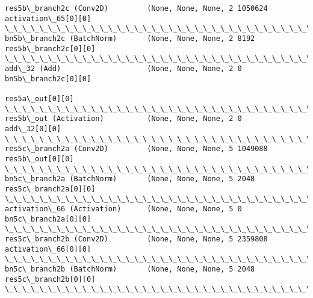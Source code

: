 \documentclass[11pt]{article}
\begin{document}
\begin{Verbatim}[commandchars=\\\{\}]
res5b\_branch2c (Conv2D)         (None, None, None, 2 1050624     activation\_65[0][0]              
\_\_\_\_\_\_\_\_\_\_\_\_\_\_\_\_\_\_\_\_\_\_\_\_\_\_\_\_\_\_\_\_\_\_\_\_\_\_\_\_\_\_\_\_\_\_\_\_\_\_\_\_\_\_\_\_\_\_\_\_\_\_\_\_\_\_\_\_\_\_\_\_\_\_\_\_\_\_\_\_\_\_\_\_\_\_\_\_\_\_\_\_\_\_\_\_\_\_
bn5b\_branch2c (BatchNorm)       (None, None, None, 2 8192        res5b\_branch2c[0][0]             
\_\_\_\_\_\_\_\_\_\_\_\_\_\_\_\_\_\_\_\_\_\_\_\_\_\_\_\_\_\_\_\_\_\_\_\_\_\_\_\_\_\_\_\_\_\_\_\_\_\_\_\_\_\_\_\_\_\_\_\_\_\_\_\_\_\_\_\_\_\_\_\_\_\_\_\_\_\_\_\_\_\_\_\_\_\_\_\_\_\_\_\_\_\_\_\_\_\_
add\_32 (Add)                    (None, None, None, 2 0           bn5b\_branch2c[0][0]              
                                                                 res5a\_out[0][0]                  
\_\_\_\_\_\_\_\_\_\_\_\_\_\_\_\_\_\_\_\_\_\_\_\_\_\_\_\_\_\_\_\_\_\_\_\_\_\_\_\_\_\_\_\_\_\_\_\_\_\_\_\_\_\_\_\_\_\_\_\_\_\_\_\_\_\_\_\_\_\_\_\_\_\_\_\_\_\_\_\_\_\_\_\_\_\_\_\_\_\_\_\_\_\_\_\_\_\_
res5b\_out (Activation)          (None, None, None, 2 0           add\_32[0][0]                     
\_\_\_\_\_\_\_\_\_\_\_\_\_\_\_\_\_\_\_\_\_\_\_\_\_\_\_\_\_\_\_\_\_\_\_\_\_\_\_\_\_\_\_\_\_\_\_\_\_\_\_\_\_\_\_\_\_\_\_\_\_\_\_\_\_\_\_\_\_\_\_\_\_\_\_\_\_\_\_\_\_\_\_\_\_\_\_\_\_\_\_\_\_\_\_\_\_\_
res5c\_branch2a (Conv2D)         (None, None, None, 5 1049088     res5b\_out[0][0]                  
\_\_\_\_\_\_\_\_\_\_\_\_\_\_\_\_\_\_\_\_\_\_\_\_\_\_\_\_\_\_\_\_\_\_\_\_\_\_\_\_\_\_\_\_\_\_\_\_\_\_\_\_\_\_\_\_\_\_\_\_\_\_\_\_\_\_\_\_\_\_\_\_\_\_\_\_\_\_\_\_\_\_\_\_\_\_\_\_\_\_\_\_\_\_\_\_\_\_
bn5c\_branch2a (BatchNorm)       (None, None, None, 5 2048        res5c\_branch2a[0][0]             
\_\_\_\_\_\_\_\_\_\_\_\_\_\_\_\_\_\_\_\_\_\_\_\_\_\_\_\_\_\_\_\_\_\_\_\_\_\_\_\_\_\_\_\_\_\_\_\_\_\_\_\_\_\_\_\_\_\_\_\_\_\_\_\_\_\_\_\_\_\_\_\_\_\_\_\_\_\_\_\_\_\_\_\_\_\_\_\_\_\_\_\_\_\_\_\_\_\_
activation\_66 (Activation)      (None, None, None, 5 0           bn5c\_branch2a[0][0]              
\_\_\_\_\_\_\_\_\_\_\_\_\_\_\_\_\_\_\_\_\_\_\_\_\_\_\_\_\_\_\_\_\_\_\_\_\_\_\_\_\_\_\_\_\_\_\_\_\_\_\_\_\_\_\_\_\_\_\_\_\_\_\_\_\_\_\_\_\_\_\_\_\_\_\_\_\_\_\_\_\_\_\_\_\_\_\_\_\_\_\_\_\_\_\_\_\_\_
res5c\_branch2b (Conv2D)         (None, None, None, 5 2359808     activation\_66[0][0]              
\_\_\_\_\_\_\_\_\_\_\_\_\_\_\_\_\_\_\_\_\_\_\_\_\_\_\_\_\_\_\_\_\_\_\_\_\_\_\_\_\_\_\_\_\_\_\_\_\_\_\_\_\_\_\_\_\_\_\_\_\_\_\_\_\_\_\_\_\_\_\_\_\_\_\_\_\_\_\_\_\_\_\_\_\_\_\_\_\_\_\_\_\_\_\_\_\_\_
bn5c\_branch2b (BatchNorm)       (None, None, None, 5 2048        res5c\_branch2b[0][0]             
\_\_\_\_\_\_\_\_\_\_\_\_\_\_\_\_\_\_\_\_\_\_\_\_\_\_\_\_\_\_\_\_\_\_\_\_\_\_\_\_\_\_\_\_\_\_\_\_\_\_\_\_\_\_\_\_\_\_\_\_\_\_\_\_\_\_\_\_\_\_\_\_\_\_\_\_\_\_\_\_\_\_\_\_\_\_\_\_\_\_\_\_\_\_\_\_\_\_

\end{Verbatim}
\end{document}
